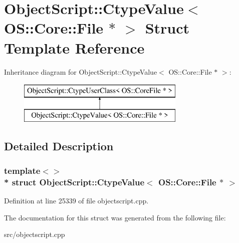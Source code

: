 \hypertarget{struct_object_script_1_1_ctype_value_3_01_o_s_1_1_core_1_1_file_01_5_01_4}{}\section{Object\+Script\+:\+:Ctype\+Value$<$ OS\+:\+:Core\+:\+:File $\ast$ $>$ Struct Template Reference}
\label{struct_object_script_1_1_ctype_value_3_01_o_s_1_1_core_1_1_file_01_5_01_4}
Inheritance diagram for Object\+Script\+:\+:Ctype\+Value$<$ OS\+:\+:Core\+:\+:File $\ast$ $>$\+:\begin{figure}[H]
\begin{center}
\leavevmode
\includegraphics[height=2.000000cm]{struct_object_script_1_1_ctype_value_3_01_o_s_1_1_core_1_1_file_01_5_01_4}
\end{center}
\end{figure}


\subsection{Detailed Description}
\subsubsection*{template$<$$>$\\*
struct Object\+Script\+::\+Ctype\+Value$<$ O\+S\+::\+Core\+::\+File $\ast$ $>$}



Definition at line 25339 of file objectscript.\+cpp.



The documentation for this struct was generated from the following file\+:\begin{DoxyCompactItemize}
\item 
src/objectscript.\+cpp\end{DoxyCompactItemize}
